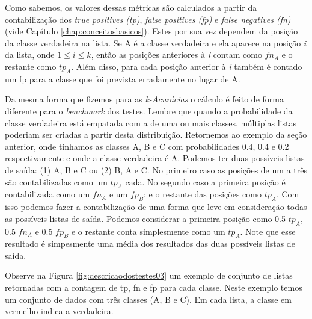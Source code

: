 {Como sabemos, os valores dessas métricas são calculados a partir da contabilização dos \textit{true positives (tp)}, \textit{false positives (fp)} e \textit{false negatives (fn)} (vide Capítulo \ref{chap:conceitosbasicos}).
Estes por sua vez dependem da posição da classe verdadeira na lista.
Se A é a classe verdadeira e ela aparece na posição \textit{i} da lista, onde $1 \leq \textit{i} \leq \textit{k}$, então as posições anteriores à \textit{i} contam como $fn_A$ e o restante como $tp_A$.
Além disso, para cada posição anterior à \textit{i} também é contado um fp para a classe que foi prevista erradamente no lugar de A.

Da mesma forma que fizemos para as \textit{k-Acurácias} o cálculo é feito de forma diferente para o \textit{benchmark} dos testes.
Lembre que quando a probabilidade da classe verdadeira está empatada com a de uma ou mais classes, múltiplas listas poderiam ser criadas a partir desta distribuição.
Retornemos ao exemplo da seção anterior, onde tínhamos as classes A, B e C com probabilidades 0.4, 0.4 e 0.2 respectivamente e onde a classe verdadeira é A.
Podemos ter duas possíveis listas de saída: (1) A, B e C ou (2) B, A e C.
No primeiro caso as posições de um a três são contabilizadas como um $tp_A$ cada.
No segundo caso a primeira posição é contabilizada como um $fn_A$ e um $fp_B$; e o restante das posições como $tp_A$.
Com isso podemos fazer a contabilização de uma forma que leve em consideração todas as possíveis listas de saída.
Podemos considerar a primeira posição como 0.5 $tp_A$, 0.5 $fn_A$ e 0.5 $fp_B$ e o restante conta simplesmente como um $tp_A$.
Note que esse resultado é simpesmente uma média dos resultados das duas possíveis listas de saída.

Observe na Figura \ref{fig:descricaodostestes03} um exemplo de conjunto de listas retornadas com a contagem de tp, fn e fp para cada classe.
Neste exemplo temos um conjunto de dados com três classes (A, B e C).
Em cada lista, a classe em vermelho indica a verdadeira.

}
